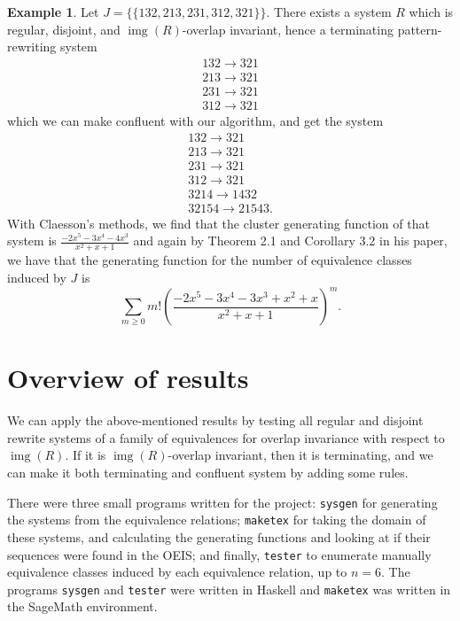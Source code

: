 \documentclass[a4paper, 11pt, english]{article}
\newcommand{\patternrule}{ \to \!}
\theoremstyle{definition}
\newtheorem{example}[theorem]{Example}
\DeclareMathOperator{\img}{img}
\begin{document}
\begin{example}

Let $J = \{ \{ 132, 213, 231, 312, 321 \} \}$. There exists a system $R$ which is regular,
disjoint, and $\img(R)$-overlap invariant, hence a terminating pattern-rewriting system
\[
    \begin{matrix}
      132 \patternrule 321 \\
      213 \patternrule 321 \\
      231 \patternrule 321 \\
      312 \patternrule 321
    \end{matrix}
\]
which we can make confluent with our algorithm, and get the system
\[
    \begin{matrix}
      132 \patternrule 321 \\
      213 \patternrule 321 \\
      231 \patternrule 321 \\
      312 \patternrule 321 \\
      3214 \patternrule 1432 \\
      32154 \patternrule 21543.
    \end{matrix}
\]
With Claesson's methods, we find that the cluster generating function of that system is
$\frac{-2x^5-3x^4-4x^3}{x^2+x+1}$ and
again by Theorem 2.1 and Corollary 3.2 in his paper, we have that the generating function for the
number of equivalence classes induced by $J$ is
\[
  \sum_{m \geq 0} m! \left( \frac{-2x^5-3x^4-3x^3+x^2+x}{x^2+x+1} \right)^m.
\]

\end{example}

\section{Overview of results}
We can apply the above-mentioned results by testing all regular and disjoint rewrite systems of a
family of equivalences for overlap invariance with respect to $\img(R)$. If it is $\img(R)$-overlap
invariant,
then it is terminating, and we can make it both terminating and confluent system by adding some rules.

There were three small programs \cite{hartjenstein:2021} written for the project: \verb|sysgen| for
generating the systems from the equivalence relations; \verb|maketex| for taking the domain of these
systems, and calculating the generating functions and looking at if their sequences were found in
the OEIS; and finally, \verb|tester| to enumerate manually equivalence classes induced by each
equivalence relation, up to $n=6$. The programs \verb|sysgen| and \verb|tester| were written in
Haskell and \verb|maketex| was written in the SageMath environment. 
\end{document}
